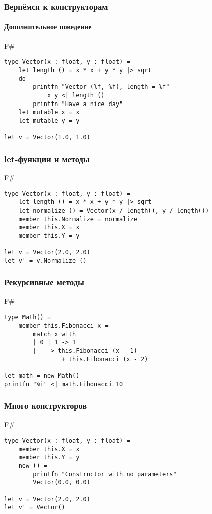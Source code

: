 \documentclass[xetex,mathserif,serif]{beamer}
\begin{document}
	\begin{frame}[fragile]
		\frametitle{Вернёмся к конструкторам}
		\framesubtitle{Дополнительное поведение}
		\begin{exampleblock}{F\#}
			\begin{verbatim}
type Vector(x : float, y : float) = 
    let length () = x * x + y * y |> sqrt
    do 
        printfn "Vector (%f, %f), length = %f" 
            x y <| length ()
        printfn "Have a nice day"
    let mutable x = x
    let mutable y = y

let v = Vector(1.0, 1.0)
			\end{verbatim}
		\end{exampleblock}
\end{frame}

	\begin{frame}[fragile]
		\frametitle{let-функции и методы}
		\begin{exampleblock}{F\#}
			\begin{verbatim}
type Vector(x : float, y : float) = 
    let length () = x * x + y * y |> sqrt
    let normalize () = Vector(x / length(), y / length())
    member this.Normalize = normalize
    member this.X = x
    member this.Y = y

let v = Vector(2.0, 2.0)
let v' = v.Normalize ()
			\end{verbatim}
		\end{exampleblock}
\end{frame}

	\begin{frame}[fragile]
		\frametitle{Рекурсивные методы}
		\begin{exampleblock}{F\#}
			\begin{verbatim}
type Math() = 
    member this.Fibonacci x = 
        match x with
        | 0 | 1 -> 1
        | _ -> this.Fibonacci (x - 1) 
                + this.Fibonacci (x - 2)

let math = new Math()
printfn "%i" <| math.Fibonacci 10
			\end{verbatim}
		\end{exampleblock}
\end{frame}

	\begin{frame}[fragile]
		\frametitle{Много конструкторов}
		\begin{exampleblock}{F\#}
			\begin{verbatim}
type Vector(x : float, y : float) = 
    member this.X = x
    member this.Y = y
    new () = 
        printfn "Constructor with no parameters"
        Vector(0.0, 0.0)

let v = Vector(2.0, 2.0)
let v' = Vector()
			\end{verbatim}
		\end{exampleblock}
\end{frame}
\end{document}
